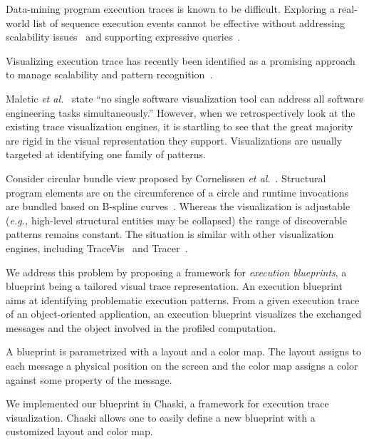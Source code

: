 \documentclass{sig-alternate}
\newcommand{\eg}{\emph{e.g.,}\xspace}
\newcommand{\etal}{\emph{et al.}\xspace}
\begin{document}
Data-mining program execution traces is known to be difficult. Exploring a real-world list of sequence execution events cannot be effective without addressing scalability issues~\cite{Kuhn06c} and supporting expressive queries~\cite{Zaid05a}. 

Visualizing execution trace has recently been identified as a promising approach to manage scalability and pattern recognition~\cite{Maoz11a,Zaid05a,Reis07a}. %

Maletic \etal~\cite{Male02a} state ``no single software visualization tool can address all software engineering tasks simultaneously.'' However, when we retrospectively look at the existing trace visualization engines, it is startling to see that the great majority are rigid in the visual representation they support. Visualizations are usually targeted at identifying one family of patterns.%

Consider circular bundle view proposed by Cornelissen \etal~\cite{Corn08a}. Structural program elements are on the circumference of a circle and runtime invocations are bundled based on B-spline curves~\cite{Holt06b}. Whereas the visualization is adjustable (\eg high-level structural entities may be collapsed) the range of discoverable patterns remains constant. The situation is similar with other visualization engines, including TraceVis~\cite{Deel07a} and Tracer~\cite{Maoz11a}.

 


We address this problem by proposing a framework for \emph{execution blueprints}, a blueprint being a tailored visual trace representation. An execution blueprint aims at identifying problematic execution patterns. From a given execution trace of an object-oriented application, an execution blueprint visualizes the exchanged messages and the object involved in the profiled computation.

A blueprint is parametrized with a layout and a color map. The layout assigns to each message a physical position on the screen and the color map assigns a color against some property of the message.

We implemented our blueprint in Chaski, a framework for execution trace visualization. Chaski allows one to easily define a new blueprint with a customized layout and color map.
\end{document}
